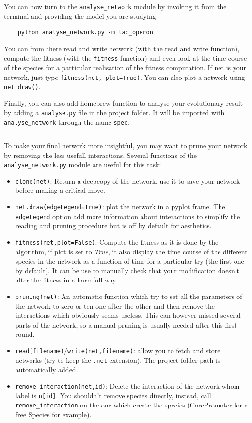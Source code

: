 \documentclass[]{article}
\begin{document}
\vspace{1em}

You can now turn to the \verb#analyse_network# module by invoking it from the
terminal and providing the model you are studying.
\begin{verbatim}
    python analyse_network.py -m lac_operon
\end{verbatim}
You can from there read and write
network (with the read and write function), compute the fitness (with
the \verb#fitness# function) and even look at the time course of the species
for a particular realisation of the fitness computation. If net is your
network, just type \verb#fitness(net, plot=True)#. You can also plot a
network using \verb#net.draw()#.

Finally, you can also add homebrew function to analyse your evolutionary
result by adding a \verb#analyse.py# file in the project folder. It will
be imported with \verb#analyse_network# through the name \verb#spec#.

\begin{center}\rule{0.5\linewidth}{\linethickness}\end{center}

To make your final network more insightful, you may want to prune your
network by removing the less usefull interactions. Several functions of
the \verb#analyse_network.py# module are useful for this task:

\begin{itemize}
\item
  \verb#clone(net)#: Return a deepcopy of the network, use it to save
  your network before making a critical move.
\item
  \verb#net.draw(edgeLegend=True)#: plot the network in a pyplot frame.
  The \verb#edgeLegend# option add more information about interactions
  to simplify the reading and pruning procedure but is off by default for
  aesthetics.
\item
  \verb#fitness(net,plot=False)#: Compute the fitness as it is done by
  the algorithm, if plot is set to \emph{True}, it also display the time
  course of the different species in the network as a function of time
  for a particular try (the first one by default). It can be use to
  manually check that your modification doesn't alter the fitness in a
  harmfull way.
\item
  \verb#pruning(net)#: An automatic function which try to set all the
  parameters of the network to zero or ten one after the other and then
  remove the interactions which obviously seems useless. This can
  however missed several parts of the network, so a manual pruning is
  usually needed after this first round.
\item
  \verb#read(filename)#/\verb#write(net,filename)#: allow you to fetch and
  store networks (try to keep the \verb#.net# extension). The project
  folder path is automatically added.
\item
  \verb#remove_interaction(net,id)#: Delete the interaction of the
  network whom label is \verb#n[id]#. You shouldn't remove species
  directly, instead, call \verb#remove_interaction# on the one which create
  the species (CorePromoter for a free Species for example).
\end{itemize}
\end{document}
